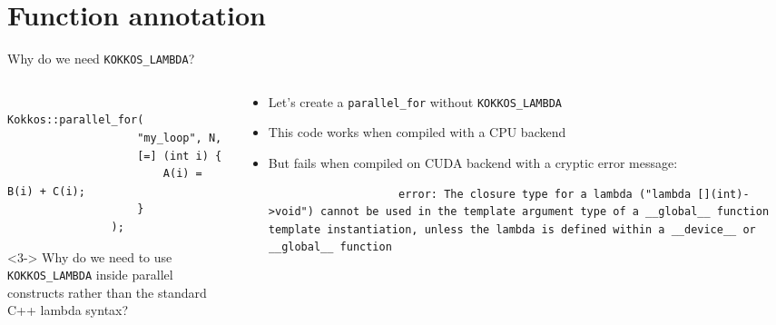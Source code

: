 \documentclass[
    aspectratio=169,
    \createHandout
]{beamer}
\begin{document}
\section{Function annotation}


\begin{frame}[fragile]{Why do we need \texttt{KOKKOS\_LAMBDA}?}
    \begin{columns}
        \begin{column}{0.4\linewidth}
            \begin{verbatim}
                Kokkos::parallel_for(
                    "my_loop", N,
                    [=] (int i) {
                        A(i) = B(i) + C(i);
                    }
                );
            \end{verbatim}
            \begin{uncoverenv}<3->
                 Why do we need to use \texttt{KOKKOS\_LAMBDA} inside parallel constructs rather than the standard C++ lambda syntax?
            \end{uncoverenv}
        \end{column}
        \begin{column}{0.6\linewidth}
            \begin{itemize}
                \item Let's create a \texttt{parallel\_for} without \texttt{KOKKOS\_LAMBDA}
                \item This code works when compiled with a CPU backend
                \pause
                \item But fails when compiled on CUDA backend with a cryptic error message:
                \begin{verbatim}
                    error: The closure type for a lambda ("lambda [](int)->void") cannot be used in the template argument type of a __global__ function template instantiation, unless the lambda is defined within a __device__ or __global__ function
                \end{verbatim}
            \end{itemize}
        \end{column}
    \end{columns}
\end{frame}

\end{document}
